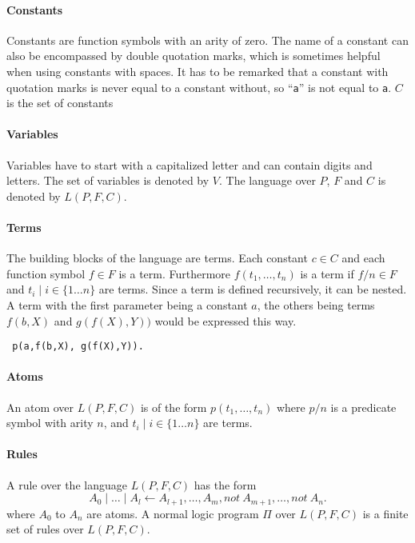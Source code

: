 \documentclass[a4paper,10pt]{article}
\begin{document}
\paragraph{Constants}
Constants are function symbols with an arity of zero.
The name of a constant can also be encompassed by double quotation marks, which is sometimes helpful when using constants with spaces. It has to be remarked that a constant with quotation marks is never equal to a constant without, so ``\texttt{a}'' is not equal to \texttt{a}.
$C$ is the set of constants
\paragraph{Variables}
Variables have to start with a capitalized letter and can contain digits and letters.
The set of variables is denoted by $V$.
The language over $P$, $F$ and $C$ is denoted by $L(P,F,C)$.
\paragraph{Terms}
The building blocks of the language are terms.
Each constant $c \in C$ and each function symbol $f \in F$ is a term.
Furthermore $f(t_1, \dots, t_n)$ is a term if $f/n \in F$ and $t_i \mid i \in \{1 \dots n\}$ are terms.
Since a term is defined recursively, it can be nested.
A term with the first parameter being a constant $a$, the others being terms $f(b,X)$ and $g(f(X), Y))$ would be expressed this way.
\begin{verbatim}
 p(a,f(b,X), g(f(X),Y)).
\end{verbatim}
\paragraph{Atoms}
An atom over $L(P, F, C)$ is of the form $p(t_1, \dots, t_n)$ where $p/n$ is a predicate
symbol with arity $n$, and $t_i \mid i \in \{1 \dots n\}$ are terms.
\paragraph{Rules}
A rule over the language $L(P,F,C)$ has the form
$$
A_0 \mid \dots \mid A_l \leftarrow A_{l+1}, \dots, A_m, not\ A_{m+1}, \dots, not\ A_n.
$$
where $A_0$ to $A_n$ are atoms. \newline
A normal logic program $\Pi$ over $L(P,F,C)$ is a finite set of rules over $L(P,F,C)$.
\end{document}
